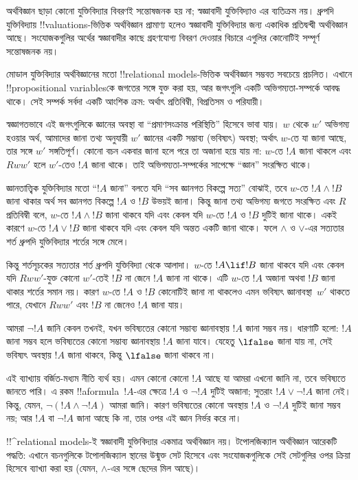 \documentclass[../../../include/open-logic-section]{subfiles}
\begin{document}


অর্থবিজ্ঞান ছাড়া কোনো যুক্তিবিদ্যার বিবরণই সন্তোষজনক হয় না;
স্বজ্ঞাবাদী যুক্তিবিদ্যাও এর ব্যতিক্রম নয়। ধ্রুপদি যুক্তিবিদ্যায়
!!{valuation}s-ভিত্তিক অর্থবিজ্ঞান প্রামাণ্য হলেও স্বজ্ঞাবাদী
যুক্তিবিদ্যার জন্য একাধিক প্রতিদ্বন্দ্বী অর্থবিজ্ঞান আছে।
সংযোজকগুলির অর্থের স্বজ্ঞাবাদীর কাছে গ্রহণযোগ্য বিবরণ দেওয়ার
বিচারে এগুলির কোনোটিই সম্পূর্ণ সন্তোষজনক নয়।

মোডাল যুক্তিবিদ্যার অর্থবিজ্ঞানের মতো !!{relational model}s-ভিত্তিক
অর্থবিজ্ঞান সম্ভবত সবচেয়ে প্রচলিত। এখানে !!{propositional variable}sকে
জগতের সঙ্গে যুক্ত করা হয়, আর জগৎগুলি একটি
অভিগম্যতা-সম্পর্কে আবদ্ধ থাকে। সেই সম্পর্ক সর্বদা একটি আংশিক ক্রম:
অর্থাৎ প্রতিবিম্বী, বিপ্রতিসম ও পরিযায়ী।

স্বজ্ঞাগতভাবে এই জগৎগুলিকে জ্ঞানের অবস্থা বা ``প্রমাণসংক্রান্ত
পরিস্থিতি'' হিসেবে ভাবা যায়। $w$ থেকে $w'$ অভিগম্য হওয়ার অর্থ,
আমাদের জানা তথ্য অনুযায়ী $w'$ জ্ঞানের একটি সম্ভাব্য (ভবিষ্যৎ)
অবস্থা; অর্থাৎ $w$-তে যা জানা আছে, তার সঙ্গে $w'$ সঙ্গতিপূর্ণ।
কোনো বচন একবার জানা হলে পরে তা অজানা হয়ে যায় না: $w$-তে $!A$
জানা থাকলে এবং $Rww'$ হলে $w'$-তেও $!A$ জানা থাকে। তাই
অভিগম্যতা-সম্পর্কের সাপেক্ষে ``জ্ঞান'' সংরক্ষিত থাকে।

জ্ঞানতাত্ত্বিক যুক্তিবিদ্যার মতো ``$!A$ জানা'' বলতে যদি ``সব
জ্ঞানগত বিকল্পে সত্য'' বোঝাই, তবে $w$-তে $!A \land !B$ জানা
থাকার অর্থ সব জ্ঞানগত বিকল্পে $!A$ ও $!B$ উভয়ই জানা। কিন্তু জানা তথ্য
অভিগম্য জগতে সংরক্ষিত এবং $R$ প্রতিবিম্বী বলে, $w$-তে $!A \land !B$ জানা
থাকবে যদি এবং কেবল যদি $w$-তে $!A$ ও $!B$ দুটিই জানা থাকে। একই
কারণে $w$-তে $!A \lor !B$ জানা থাকবে যদি এবং কেবল যদি অন্তত
একটি জানা থাকে। ফলে $\land$ ও $\lor$-এর সত্যতার শর্ত ধ্রুপদি
যুক্তিবিদ্যার শর্তের সঙ্গে মেলে।

কিন্তু শর্তসূচকের সত্যতার শর্ত ধ্রুপদি যুক্তিবিদ্যা থেকে আলাদা।
$w$-তে $!A \lif !B$ জানা থাকবে যদি এবং কেবল যদি $Rww'$-যুক্ত
কোনো $w'$-তেই $!B$ না জেনে $!A$ জানা না থাকে। এটি $w$-তে
$!A$ অজানা অথবা $!B$ জানা থাকার শর্তের সমান নয়। কারণ $w$-তে
$!A$ ও $!B$ কোনোটিই জানা না থাকলেও এমন ভবিষ্যৎ জ্ঞানাবস্থা~$w'$
থাকতে পারে, যেখানে $Rww'$ এবং $!B$ না জেনেও $!A$ জানা যায়।

আমরা $\lnot !A$ জানি কেবল তখনই, যখন ভবিষ্যতের কোনো সম্ভাব্য
জ্ঞানাবস্থায় $!A$ জানা সম্ভব নয়। ধারণাটি হলো: $!A$ জানা সম্ভব
হলে ভবিষ্যতের কোনো সম্ভাব্য জ্ঞানাবস্থায় $!A$ জানা যাবে। যেহেতু
$\lfalse$ জানা যায় না, সেই ভবিষ্যৎ অবস্থায় $!A$ জানা থাকবে,
কিন্তু $\lfalse$ জানা থাকবে না।

এই ব্যাখ্যায় বর্জিত-মধ্যম নীতি ব্যর্থ হয়। এমন কোনো কোনো $!A$ আছে
যা আমরা এখনো জানি না, তবে ভবিষ্যতে জানতে পারি। এ রকম
!!a{formula}~$!A$-এর ক্ষেত্রে $!A$ ও $\lnot !A$ দুটিই অজানা;
সুতরাং $!A \lor \lnot !A$ জানা নেই। কিন্তু, যেমন,
$\lnot(!A \land \lnot !A)$ আমরা জানি। কারণ ভবিষ্যতের কোনো
অবস্থায় $!A$ ও $\lnot !A$ দুটিই জানা সম্ভব নয়; আর $!A$ বা
$\lnot !A$ জানা আছে কি না, তার ওপর এই জ্ঞান নির্ভর করে না।

!!^{relational model}s-ই স্বজ্ঞাবাদী যুক্তিবিদ্যার একমাত্র
অর্থবিজ্ঞান নয়। টপোলজিক্যাল অর্থবিজ্ঞান আরেকটি পদ্ধতি: এখানে
বচনগুলিকে টপোলজিক্যাল স্থানের উন্মুক্ত সেট হিসেবে এবং সংযোজকগুলিকে
সেই সেটগুলির ওপর ক্রিয়া হিসেবে ব্যাখ্যা করা হয় (যেমন,
$\land$-এর সঙ্গে ছেদের মিল আছে)।
\end{document}
